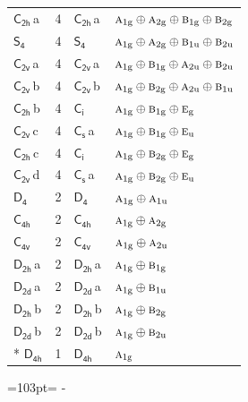 \documentclass[10pt,a4paper]{article}
\newcommand{\needspace}[1]{\par\penalty-100\begingroup\dimen0=#1\relax\dimen2=\pagegoal
  \advance\dimen2-\pagetotal\ifdim\dimen0>\dimen2\relax\ifdim\dimen2>0pt\vfil\break\fi\fi
  \endgroup}
\numberwithin{equation}{section}
\newcommand{\grp}[1]{\mathsf{#1}}
\newcommand{\irr}[1]{\text{\normalfont\scshape #1}}
\newcommand{\ptag}[1]{\mathrm{#1}}
\newcommand{\clsletter}[1]{\,{\scriptsize\color{black!55}#1}}
\newlength{\fillwidth}\newlength{\cellwidth}\newlength{\colwidth}
\begin{document}
{\begin{longtable}{@{}lrl>{\RaggedRight\arraybackslash}p{\fillwidth}@{}}
\href{C2h.pdf}{$\grp{C_{2h}}$}\clsletter{a} & 4 & \href{C2h.pdf}{$\grp{C_{2h}}$}\clsletter{a} & $\irr{a}_{1\ptag{g}}\oplus \irr{a}_{2\ptag{g}}\oplus \irr{b}_{1\ptag{g}}\oplus \irr{b}_{2\ptag{g}}$\\
\href{S4.pdf}{$\grp{S_{4}}$} & 4 & \href{S4.pdf}{$\grp{S_{4}}$} & $\irr{a}_{1\ptag{g}}\oplus \irr{a}_{2\ptag{g}}\oplus \irr{b}_{1\ptag{u}}\oplus \irr{b}_{2\ptag{u}}$\\
\href{C2v.pdf}{$\grp{C_{2v}}$}\clsletter{a} & 4 & \href{C2v.pdf}{$\grp{C_{2v}}$}\clsletter{a} & $\irr{a}_{1\ptag{g}}\oplus \irr{b}_{1\ptag{g}}\oplus \irr{a}_{2\ptag{u}}\oplus \irr{b}_{2\ptag{u}}$\\
\href{C2v.pdf}{$\grp{C_{2v}}$}\clsletter{b} & 4 & \href{C2v.pdf}{$\grp{C_{2v}}$}\clsletter{b} & $\irr{a}_{1\ptag{g}}\oplus \irr{b}_{2\ptag{g}}\oplus \irr{a}_{2\ptag{u}}\oplus \irr{b}_{1\ptag{u}}$\\
\href{C2h.pdf}{$\grp{C_{2h}}$}\clsletter{b} & 4 & \href{S2.pdf}{$\grp{C_{i}}$} & $\irr{a}_{1\ptag{g}}\oplus \irr{b}_{1\ptag{g}}\oplus \irr{e}_{\ptag{g}}$\\
\href{C2v.pdf}{$\grp{C_{2v}}$}\clsletter{c} & 4 & \href{C1v.pdf}{$\grp{C_{s}}$}\clsletter{a} & $\irr{a}_{1\ptag{g}}\oplus \irr{b}_{1\ptag{g}}\oplus \irr{e}_{\ptag{u}}$\\
\href{C2h.pdf}{$\grp{C_{2h}}$}\clsletter{c} & 4 & \href{S2.pdf}{$\grp{C_{i}}$} & $\irr{a}_{1\ptag{g}}\oplus \irr{b}_{2\ptag{g}}\oplus \irr{e}_{\ptag{g}}$\\
\href{C2v.pdf}{$\grp{C_{2v}}$}\clsletter{d} & 4 & \href{C1v.pdf}{$\grp{C_{s}}$}\clsletter{a} & $\irr{a}_{1\ptag{g}}\oplus \irr{b}_{2\ptag{g}}\oplus \irr{e}_{\ptag{u}}$\\
\href{D4.pdf}{$\grp{D_{4}}$} & 2 & \href{D4.pdf}{$\grp{D_{4}}$} & $\irr{a}_{1\ptag{g}}\oplus \irr{a}_{1\ptag{u}}$\\
\href{C4h.pdf}{$\grp{C_{4h}}$} & 2 & \href{C4h.pdf}{$\grp{C_{4h}}$} & $\irr{a}_{1\ptag{g}}\oplus \irr{a}_{2\ptag{g}}$\\
\href{C4v.pdf}{$\grp{C_{4v}}$} & 2 & \href{C4v.pdf}{$\grp{C_{4v}}$} & $\irr{a}_{1\ptag{g}}\oplus \irr{a}_{2\ptag{u}}$\\
\href{D2h.pdf}{$\grp{D_{2h}}$}\clsletter{a} & 2 & \href{D2h.pdf}{$\grp{D_{2h}}$}\clsletter{a} & $\irr{a}_{1\ptag{g}}\oplus \irr{b}_{1\ptag{g}}$\\
\href{D2d.pdf}{$\grp{D_{2d}}$}\clsletter{a} & 2 & \href{D2d.pdf}{$\grp{D_{2d}}$}\clsletter{a} & $\irr{a}_{1\ptag{g}}\oplus \irr{b}_{1\ptag{u}}$\\
\href{D2h.pdf}{$\grp{D_{2h}}$}\clsletter{b} & 2 & \href{D2h.pdf}{$\grp{D_{2h}}$}\clsletter{b} & $\irr{a}_{1\ptag{g}}\oplus \irr{b}_{2\ptag{g}}$\\
\href{D2d.pdf}{$\grp{D_{2d}}$}\clsletter{b} & 2 & \href{D2d.pdf}{$\grp{D_{2d}}$}\clsletter{b} & $\irr{a}_{1\ptag{g}}\oplus \irr{b}_{2\ptag{u}}$\\*
\href{D4h.pdf}{$\grp{D_{4h}}$} & 1 & \href{D4h.pdf}{$\grp{D_{4h}}$} & $\irr{a}_{1\ptag{g}}$\\
\bottomrule\end{longtable}}
\needspace{103pt}
\end{document}
